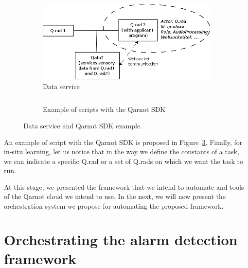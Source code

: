 \documentclass[10pt, conference, compsocconf]{IEEEtran}
\begin{document}
	\begin{figure}[ht]
          \begin{subfigure}[b]{0.4\textwidth}
            \captionsetup{skip=0pt}
            \centering
            \includegraphics[scale=0.25]{./Figures/DataService.png}
            \caption{Data service \label{subfig:qaiot}}
          \end{subfigure}
          \begin{subfigure}[b]{0.6\textwidth}
            \captionsetup{skip=0pt}
            \centering
            \inputminted[baselinestretch=.8, bgcolor=LightGray, fontsize=\scriptsize]{python}{sample.py}
            \caption{Example of scripts with the Qarnot SDK \label{subfig:sample}}
          \end{subfigure}
          \caption{Data service and Qarnot SDK example.} 
          \label{fig:arch}
	\end{figure}

An example of script with the Qarnot SDK is proposed in Figure~\ref{fig:arch}. Finally, for in-situ learning, let us notice that 
in the way we define the constants of a task, we can indicate a specific Q.rad or a set of Q.rads on which we want the task to run.

At this stage, we presented the framework that we intend to automate and tools of the Qarnot cloud we intend to use. 
In the next, we will now present the orchestration system we propose for automating the proposed framework. 

\section{Orchestrating the alarm detection framework} \label{Orchestrator}
\end{document}
